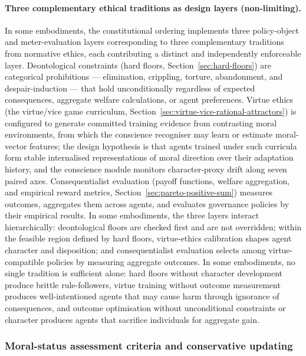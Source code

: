 \documentclass[a4paper,12pt]{article}
\begin{document}
\paragraph{Three complementary ethical traditions as design layers
(non-limiting).}

In some embodiments, the constitutional ordering implements three
policy-object and meter-evaluation layers corresponding to three
complementary traditions from normative ethics, each contributing a
distinct and independently enforceable layer. Deontological
constraints (hard floors, Section~\ref{sec:hard-floors}) are
categorical prohibitions --- elimination, crippling, torture,
abandonment, and despair-induction --- that hold unconditionally
regardless of expected consequences, aggregate welfare calculations,
or agent preferences.
Virtue ethics (the virtue/vice game curriculum,
Section~\ref{sec:virtue-vice-rational-attractors}) is configured to
generate committed training evidence from contrasting moral
environments, from which the conscience recogniser may learn or
estimate moral-vector features; the design hypothesis is that
agents trained under such curricula form stable internalised
representations of moral direction over their adaptation history,
and the conscience module monitors character-proxy drift along
seven paired axes. Consequentialist evaluation (payoff
functions, welfare aggregation, and empirical reward metrics,
Section~\ref{sec:pareto-positive-sum}) measures outcomes, aggregates
them across agents, and evaluates governance policies by their
empirical results. In some embodiments, the three layers interact
hierarchically: deontological floors are checked first and are not
overridden; within the feasible region defined by hard floors,
virtue-ethics calibration shapes agent character and disposition; and
consequentialist evaluation selects among virtue-compatible policies
by measuring aggregate outcomes. In some embodiments, no single
tradition is sufficient alone: hard floors without character
development produce brittle rule-followers, virtue training without
outcome measurement produces well-intentioned agents that may cause
harm through ignorance of consequences, and outcome optimisation
without unconditional constraints or character produces agents that
sacrifice individuals for aggregate gain.
\subsubsection{Moral-status assessment criteria and conservative updating}
\end{document}
